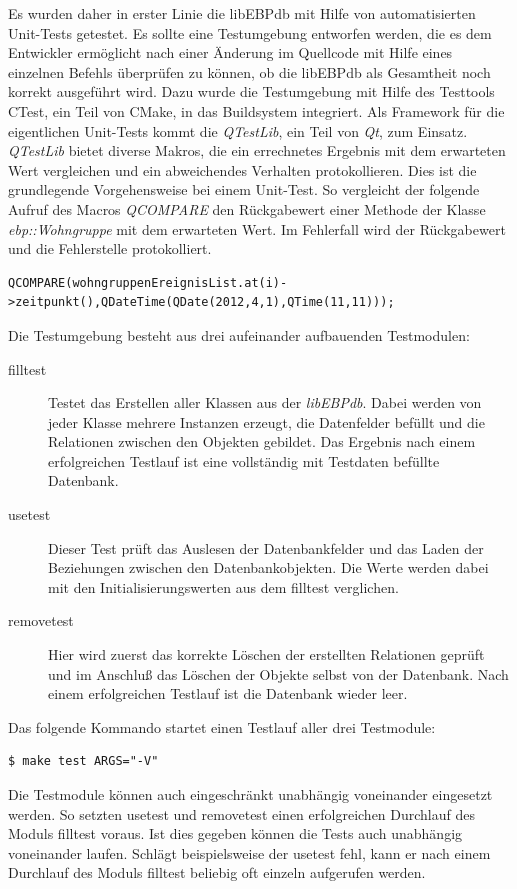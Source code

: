 Es wurden daher in erster Linie die libEBPdb mit Hilfe von automatisierten Unit-Tests getestet. Es sollte eine Testumgebung entworfen werden, die es
dem Entwickler ermöglicht nach einer Änderung im Quellcode mit Hilfe eines einzelnen Befehls überprüfen zu können, ob die libEBPdb als Gesamtheit noch
korrekt ausgeführt wird. Dazu wurde die Testumgebung mit Hilfe des Testtools CTest, ein Teil von CMake, in das Buildsystem integriert. Als Framework
für die eigentlichen Unit-Tests kommt die \textit{QTestLib}, ein Teil von \textit{Qt}, zum Einsatz. \textit{QTestLib} bietet diverse Makros, die ein errechnetes Ergebnis mit dem
erwarteten Wert vergleichen und ein abweichendes Verhalten protokollieren. Dies ist die grundlegende Vorgehensweise bei einem Unit-Test. So
vergleicht der folgende Aufruf des Macros \textit{QCOMPARE} den Rückgabewert einer Methode der Klasse \textit{ebp::Wohngruppe} mit dem erwarteten Wert. Im Fehlerfall
wird der Rückgabewert und die Fehlerstelle protokolliert.
\begin{lstlisting}
QCOMPARE(wohngruppenEreignisList.at(i)->zeitpunkt(),QDateTime(QDate(2012,4,1),QTime(11,11)));
\end{lstlisting}
Die Testumgebung besteht aus drei aufeinander aufbauenden Testmodulen:
\begin{description}
 \item [fill\textunderscore test] Testet das Erstellen aller Klassen aus der \textit{libEBPdb}. Dabei werden von jeder Klasse mehrere Instanzen erzeugt, die
Datenfelder befüllt und die Relationen zwischen den Objekten gebildet. Das Ergebnis nach einem erfolgreichen Testlauf ist eine vollständig mit
Testdaten befüllte Datenbank.
 \item [use\textunderscore test] Dieser Test prüft das Auslesen der Datenbankfelder und das Laden der Beziehungen zwischen den Datenbankobjekten. Die
Werte werden dabei mit den Initialisierungswerten aus dem fill\textunderscore test verglichen.
 \item [remove\textunderscore test] Hier wird zuerst das korrekte Löschen der erstellten Relationen geprüft und im Anschluß das Löschen der Objekte
selbst von der Datenbank. Nach einem erfolgreichen Testlauf ist die Datenbank wieder leer.
\end{description}
Das folgende Kommando startet einen Testlauf aller drei Testmodule:
\begin{lstlisting}
$ make test ARGS="-V"
\end{lstlisting}
Die Testmodule können auch eingeschränkt unabhängig voneinander eingesetzt werden. So setzten use\textunderscore test und remove\textunderscore test
einen erfolgreichen Durchlauf des Moduls fill\textunderscore test voraus. Ist dies gegeben können die Tests auch unabhängig voneinander laufen.
Schlägt beispielsweise der use\textunderscore test fehl, kann er nach einem Durchlauf des Moduls fill\textunderscore test beliebig oft einzeln
aufgerufen werden.

